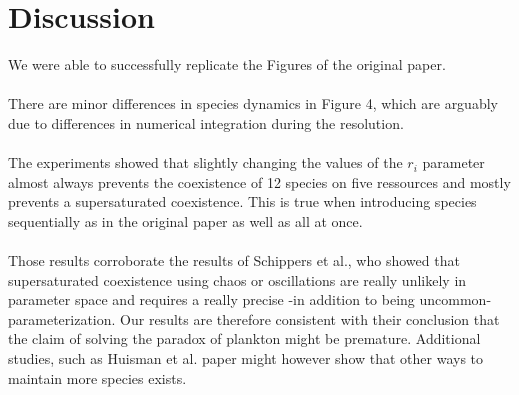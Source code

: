 \section{Discussion}
We were able to successfully replicate the Figures of the original paper.\\ 
\\
There are minor differences in species dynamics in Figure 4, which are arguably due to differences in numerical integration  during 
the resolution.\\
\\
The experiments showed that slightly changing the values of the $r_i$ parameter almost always 
prevents the coexistence of 12 species on five ressources and mostly prevents a 
supersaturated coexistence. This is true when introducing species sequentially 
as in the original paper as well as all at once. \\
\\
Those results corroborate the results of Schippers et 
al.\supercite{2008:Schippers}, who showed that supersaturated coexistence using chaos or 
oscillations are really unlikely in parameter space and requires a really 
precise -in addition to being uncommon- parameterization. Our results are 
therefore consistent with their conclusion that the claim of solving the paradox 
of plankton might be premature. Additional studies, such as Huisman et al. \supercite{2008:Huisman} paper might however show that other ways to maintain more species exists. 



